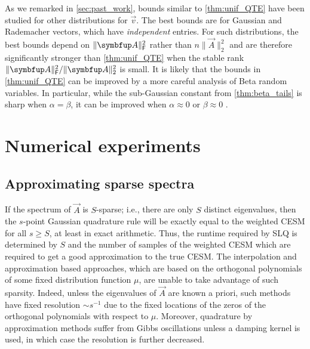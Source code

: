 As we remarked in \cref{sec:past_work}, bounds similar to \cref{thm:unif_QTE} have been studied for other distributions for \( \vec{v} \). 
The best bounds are for Gaussian and Rademacher vectors, which have \emph{independent} entries. 
For such distributions, the best bounds depend on \( \|\vec{A}\|_\F^2 \) rather than \( n\|\vec{A}\|_2^2 \) and are therefore significantly stronger than \cref{thm:unif_QTE} when the stable rank \( \| \vec{A} \|_\F^2 / \| \vec{A}\|_2^2 \) is small. 
It is likely that the bounds in \cref{thm:unif_QTE} can be improved by a more careful analysis of Beta random variables. 
In particular, while the sub-Gaussian constant from \cref{thm:beta_tails} is sharp when \( \alpha = \beta \), it can be improved when \( \alpha \approx 0 \) or \( \beta\approx 0 \) \cite{zhang_zhou_20}.


\section{Numerical experiments}

\subsection{Approximating sparse spectra}

If the spectrum of \( \vec{A} \) is \( S \)-sparse; i.e., there are only \( S \) distinct eigenvalues, then the \( s \)-point Gaussian quadrature rule will be exactly equal to the weighted CESM for all \( s \geq S \), at least in exact arithmetic.
Thus, the runtime required by SLQ is determined by \( S \) and the number of samples of the weighted CESM which are required to get a good approximation to the true CESM.
The interpolation and approximation based approaches, which are based on the orthogonal polynomials of some fixed distribution function \( \mu \), are unable to take advantage of such sparsity.
Indeed, unless the eigenvalues of \( \vec{A} \) are known a priori, such methods have fixed resolution \( \sim s^{-1} \) due to the fixed locations of the zeros of the orthogonal polynomials with respect to \( \mu \).
Moreover, quadrature by approximation methods suffer from Gibbs oscillations unless a damping kernel is used, in which case the resolution is further decreased.


